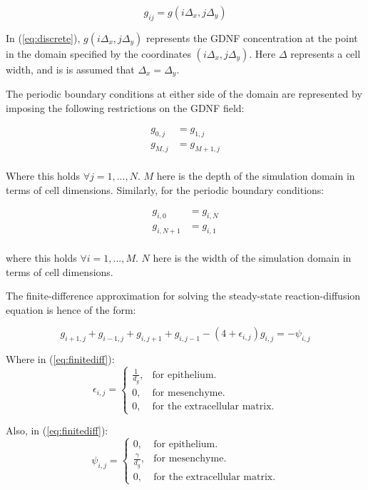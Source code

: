 \documentclass[pdftex,10pt,a4paper,twocolumn]{article}
\begin{document}
\begin{equation}\label{eq:discrete}
g_{ij} = g(i\Delta_x, j\Delta_y)
\end{equation}

In (\ref{eq:discrete}), $g(i\Delta_x, j\Delta_y)$ represents the GDNF concentration at the point in the domain specified by the coordinates $(i\Delta_x, j\Delta_y)$. Here $\Delta$ represents a cell width, and is is assumed that $\Delta_x = \Delta_y$.

The periodic boundary conditions at either side of the domain are represented by imposing the following restrictions on the GDNF field:

\begin{align*}
g_{0,j}& = g_{1,j}\\
g_{M,j}& = g_{M+1,j}\\
\end{align*}

Where this holds $\forall j = 1,...,N$. $M$ here is the depth of the simulation domain in terms of cell dimensions. Similarly, for the periodic boundary conditions:

\begin{align*}
g_{i,0}& = g_{i,N}\\
g_{i,N+1}& = g_{i,1}\\
\end{align*}

where this holds $\forall i = 1,...,M$. $N$ here is the width of the simulation domain in terms of cell dimensions.

The finite-difference approximation for solving the steady-state reaction-diffusion equation is hence of the form:

\begin{equation}\label{eq:finitediff}
g_{i+1,j} + g_{i-1,j} + g_{i,j+1} + g_{i,j-1} - (4 + \epsilon_{i,j})g_{i,j} = -\psi_{i,j}
\end{equation}

Where in (\ref{eq:finitediff}):
\begin{equation}
\epsilon_{i,j} =\begin{cases}
\frac{1}{d_g}, & \text{for epithelium}.\\
0, & \text{for mesenchyme}.\\
0, & \text{for the extracellular matrix}.
\end{cases}
\end{equation}

Also, in (\ref{eq:finitediff}):
\begin{equation} \label{eq:psi}
\psi_{i,j} =\begin{cases}
0, & \text{for epithelium}.\\
\frac{\gamma}{d_g}, & \text{for mesenchyme}.\\
0, & \text{for the extracellular matrix}.
\end{cases}
\end{equation}
\end{document}
